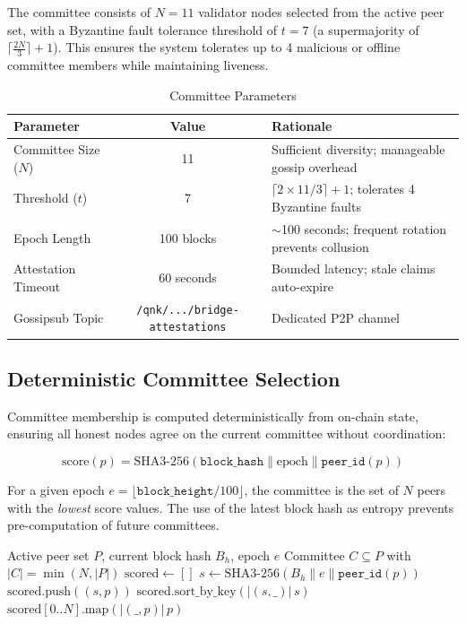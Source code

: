 \documentclass[11pt,a4paper]{article}
\begin{document}
The committee consists of $N = 11$ validator nodes selected from the active peer set, with a Byzantine fault tolerance threshold of $t = 7$ (a supermajority of $\lceil \frac{2N}{3} \rceil + 1$). This ensures the system tolerates up to 4 malicious or offline committee members while maintaining liveness.

\begin{table}[H]
\centering
\caption{Committee Parameters}
\begin{tabular}{l c l}
\toprule
\textbf{Parameter} & \textbf{Value} & \textbf{Rationale} \\
\midrule
Committee Size ($N$) & 11 & Sufficient diversity; manageable gossip overhead \\
Threshold ($t$) & 7 & $\lceil 2 \times 11 / 3 \rceil + 1$; tolerates 4 Byzantine faults \\
Epoch Length & 100 blocks & $\sim$100 seconds; frequent rotation prevents collusion \\
Attestation Timeout & 60 seconds & Bounded latency; stale claims auto-expire \\
Gossipsub Topic & \texttt{/qnk/.../bridge-attestations} & Dedicated P2P channel \\
\bottomrule
\end{tabular}
\end{table}

\subsection{Deterministic Committee Selection}

Committee membership is computed deterministically from on-chain state, ensuring all honest nodes agree on the current committee without coordination:

\begin{equation}
    \text{score}(p) = \text{SHA3-256}(\texttt{block\_hash} \| \text{epoch} \| \texttt{peer\_id}(p))
\end{equation}

\noindent For a given epoch $e = \lfloor \texttt{block\_height} / 100 \rfloor$, the committee is the set of $N$ peers with the \emph{lowest} score values. The use of the latest block hash as entropy prevents pre-computation of future committees.

\begin{algorithm}[H]
\caption{Committee Selection}
\begin{algorithmic}[1]
\Require Active peer set $P$, current block hash $B_h$, epoch $e$
\Ensure Committee $C \subseteq P$ with $|C| = \min(N, |P|)$
\State $\text{scored} \leftarrow []$
    \State $s \leftarrow \text{SHA3-256}(B_h \| e \| \texttt{peer\_id}(p))$
    \State $\text{scored}.\text{push}((s, p))$
\EndFor
\State $\text{scored}.\text{sort\_by\_key}(|(s,\_)| \, s)$
\State \Return $\text{scored}[0..N].\text{map}(|(\_,p)| \, p)$
\end{algorithmic}
\end{algorithm}
\end{document}
